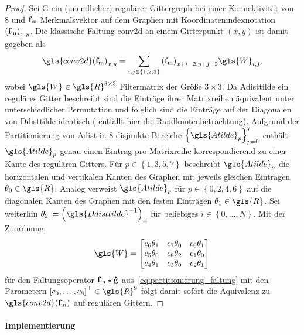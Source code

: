 \begin{proof}
Sei \gls{G} ein (unendlicher) regulärer Gittergraph bei einer Konnektivität von $8$ und $\mathbf{f}_{\mathrm{in}}$ Merkmalsvektor auf dem Graphen mit Koordinatenindexnotation ${\left(\ve{f}_{\mathrm{in}}\right)}_{x,y}$.
  Die klassische Faltung \gls{conv2d} an einem Gitterpunkt $\left(x, y\right)$ ist damit gegeben als
\begin{equation*}
  {\gls{conv2d}\left({\ve{f}_{\mathrm{in}}}\right)}_{x,y} = \sum_{i,j \in \left\{1, 2, 3\right\}} {\left(\ve{f}_{\mathrm{in}}\right)}_{x+i-2, y+j-2} \gls{W}_{i, j},
\end{equation*}
wobei $\gls{W} \in \gls{R}^{3 \times 3}$ Filtermatrix der Größe $3 \times 3$.
Da \gls{Adisttilde} ein reguläres Gitter beschreibt sind die Einträge ihrer Matrixreihen äquivalent unter unterschiedlicher Permutation und folglich sind die Einträge auf der Diagonalen von \gls{Ddisttilde} identisch (\oBdA{} entfällt hier die Randknotenbetrachtung).
Aufgrund der Partitionierung von \gls{Adist} in $8$ disjunkte Bereiche ${\left\{\gls{Atilde}_p\right\}}_{p=0}^7$ enthält $\gls{Atilde}_p$ genau einen Eintrag pro Matrixreihe korrespondierend zu einer Kante des regulären Gitters.
Für $p \in \left\{1, 3, 5, 7\right\}$ beschreibt $\gls{Atilde}_p$ die horizontalen und vertikalen Kanten des Graphen mit jeweils gleichen Einträgen $\theta_0 \in \gls{R}$.
Analog verweist $\gls{Atilde}_p$ für $p \in \left\{0, 2, 4, 6\right\}$ auf die diagonalen Kanten des Graphen mit den festen Einträgen $\theta_1 \in \gls{R}$.
Sei weiterhin \oBdA{} $\theta_2 \coloneqq {\left(\gls{Ddisttilde}^{-1}\right)}_{ii}$ für beliebiges $i \in \left\{0, \ldots, N\right\}$.
Mit der Zuordnung
\begin{equation*}
  \gls{W} = \begin{bmatrix}
    c_6\theta_1 & c_7\theta_0 & c_0\theta_1\\
    c_5\theta_0 & c_8\theta_2 & c_1\theta_0\\
    c_4\theta_1 & c_3\theta_0 & c_2\theta_1
  \end{bmatrix}
\end{equation*}
  für den Faltungsoperator $\mathbf{f}_{\mathrm{in}} \star \mathbf{\hat g}$ aus~\eqref{eq:partitionierung_faltung} mit den Parametern ${\left[c_0, \ldots, c_8\right]}^{\top} \in \gls{R}^9$
folgt damit sofort die Äquivalenz zu $\gls{conv2d}\left(\ve{f}_{\mathrm{in}}\right)$ auf regulären Gittern.
\end{proof}

\paragraph{Implementierung}
\label{partitionierung_implementierung}

